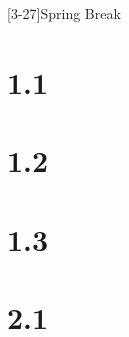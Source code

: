 \documentclass{schedule}
\begin{document}
\maketitle
\begin{schedule}
	[3-27]{Spring Break}

	\syllabus
	\section{1.1}
	\section{1.2}
	\section[2]{1.3}
	\examreview
	\exam[noquiz]

	\section{2.1}
	\finalreview
	\finalsweek[5-7][5]
	\winterbreak
\end{schedule}
\end{document}
